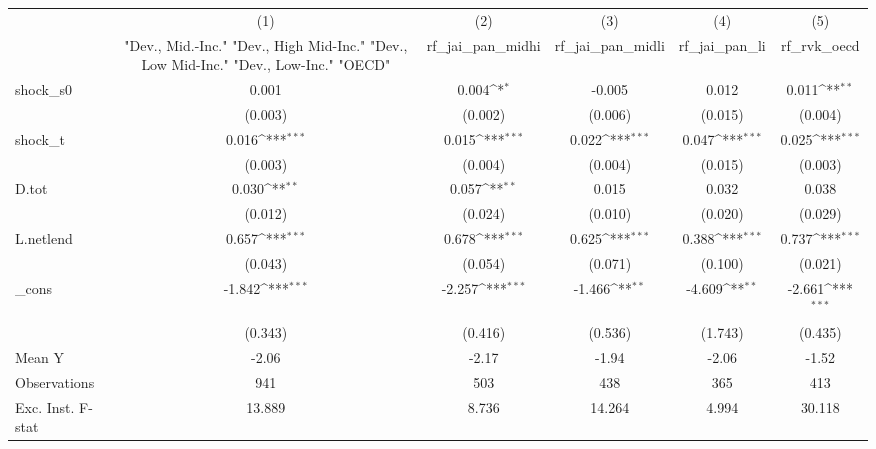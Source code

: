 {
\def\sym#1{\ifmmode^{#1}\else\(^{#1}\)\fi}
\begin{tabular}{l*{5}{c}}
\toprule
            &\multicolumn{1}{c}{(1)}&\multicolumn{1}{c}{(2)}&\multicolumn{1}{c}{(3)}&\multicolumn{1}{c}{(4)}&\multicolumn{1}{c}{(5)}\\
            &\multicolumn{1}{c}{ "Dev., Mid.-Inc." "Dev., High Mid-Inc." "Dev., Low Mid-Inc." "Dev., Low-Inc." "OECD" }&\multicolumn{1}{c}{rf\_jai\_pan\_midhi}&\multicolumn{1}{c}{rf\_jai\_pan\_midli}&\multicolumn{1}{c}{rf\_jai\_pan\_li}&\multicolumn{1}{c}{rf\_rvk\_oecd}\\
\midrule
shock\_s0    &       0.001         &       0.004\sym{*}  &      -0.005         &       0.012         &       0.011\sym{**} \\
            &     (0.003)         &     (0.002)         &     (0.006)         &     (0.015)         &     (0.004)         \\
\addlinespace
shock\_t     &       0.016\sym{***}&       0.015\sym{***}&       0.022\sym{***}&       0.047\sym{***}&       0.025\sym{***}\\
            &     (0.003)         &     (0.004)         &     (0.004)         &     (0.015)         &     (0.003)         \\
\addlinespace
D.tot       &       0.030\sym{**} &       0.057\sym{**} &       0.015         &       0.032         &       0.038         \\
            &     (0.012)         &     (0.024)         &     (0.010)         &     (0.020)         &     (0.029)         \\
\addlinespace
L.netlend   &       0.657\sym{***}&       0.678\sym{***}&       0.625\sym{***}&       0.388\sym{***}&       0.737\sym{***}\\
            &     (0.043)         &     (0.054)         &     (0.071)         &     (0.100)         &     (0.021)         \\
\addlinespace
\_cons      &      -1.842\sym{***}&      -2.257\sym{***}&      -1.466\sym{**} &      -4.609\sym{**} &      -2.661\sym{***}\\
            &     (0.343)         &     (0.416)         &     (0.536)         &     (1.743)         &     (0.435)         \\
\midrule
Mean Y      &       -2.06         &       -2.17         &       -1.94         &       -2.06         &       -1.52         \\
Observations&         941         &         503         &         438         &         365         &         413         \\
Exc. Inst. F-stat&      13.889         &       8.736         &      14.264         &       4.994         &      30.118         \\
\bottomrule
\end{tabular}
}
